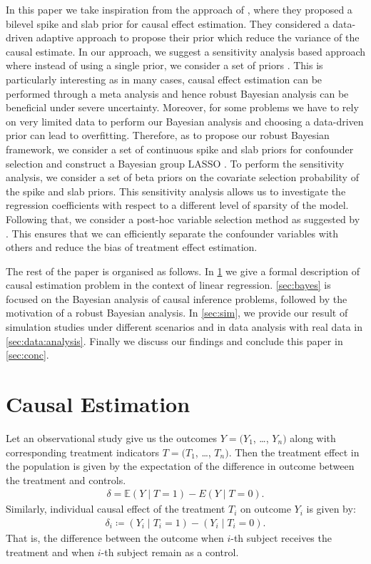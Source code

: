 \documentclass{amsart}
\begin{document}
In this paper we take inspiration from the approach of \citet{koch2020}, where
they proposed a bilevel spike and slab prior for causal effect 
estimation. They considered a data-driven adaptive approach to
propose their prior which reduce the variance of the causal estimate. 
In our approach,
we suggest a sensitivity analysis based approach where instead
of using a single prior, we consider a set of priors \cite{BERGER1990303}. This is particularly interesting as in
many cases, causal effect estimation can be performed through a 
meta analysis and hence robust Bayesian analysis can be beneficial
\cite{raices_cruz22} under severe uncertainty.
Moreover, for some problems we have to rely on very limited data to
perform our Bayesian analysis and choosing a data-driven prior
can lead to overfitting. Therefore, as to propose our
robust Bayesian framework,
we consider a set of continuous spike and slab priors \cite{ishwaran2005}
for confounder selection and construct a Bayesian group LASSO
\cite{xu2015}. To perform the sensitivity analysis, we consider
a set of beta priors on the covariate selection probability
of the spike and slab priors. This sensitivity analysis allows us
to investigate the regression coefficients with respect to a different
level of sparsity of the model. Following that, we consider a post-hoc
variable selection method as suggested by \citet{hahn2015}. This
ensures that we can efficiently separate the confounder variables
with others and reduce the bias of treatment effect estimation.

The rest of the paper is organised as follows. In \cref{sec:causal}
we give a formal description of causal estimation problem in the
context of linear regression. \cref{sec:bayes} is focused on the
Bayesian analysis of causal inference problems, followed by the
motivation of a robust Bayesian analysis. In \cref{sec:sim}, we
provide our result of simulation studies under different 
scenarios and in data analysis with real data in \cref{sec:data:analysis}. Finally we discuss our findings and 
conclude this paper in \cref{sec:conc}.

\section{Causal Estimation}\label{sec:causal}

Let an observational study give us the outcomes $Y=(Y_1$, \dots, $Y_n)$ along with 
corresponding treatment indicators $T=(T_1$, \dots, $T_n)$. Then the
treatment 
effect in the population is given by the expectation of the difference
in outcome between the treatment and controls. 
\begin{align}
\delta = \mathbb{E}(Y\mid T =1) - E(Y\mid T=0).
\end{align}
Similarly, individual causal
effect of the treatment $T_i$ on outcome $Y_i$ is given by:
\begin{align}
\delta_i \coloneqq (Y_i\mid T_i=1) - (Y_i\mid T_i=0).
\end{align}
That is, the difference between the outcome when $i$-th subject receives
the treatment and when $i$-th subject remain as a control. 
\end{document}
